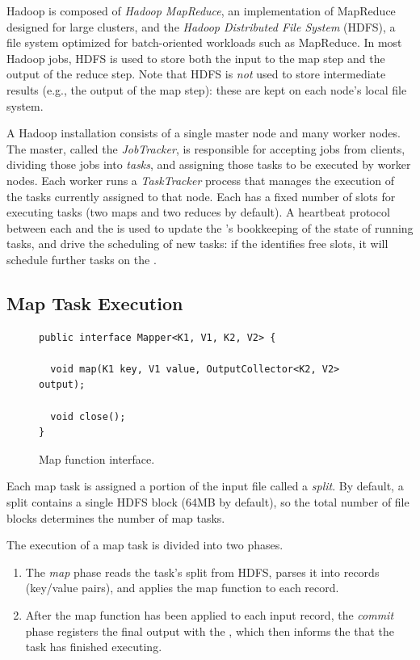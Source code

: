 Hadoop is composed of \emph{Hadoop MapReduce}, an implementation of MapReduce
designed for large clusters, and the \emph{Hadoop Distributed File System}
(HDFS), a file system optimized for batch-oriented workloads such as MapReduce.
In most Hadoop jobs, HDFS is used to store both the input to the map step and
the output of the reduce step.  Note that HDFS is \emph{not} used to store
intermediate results (e.g., the output of the map step): these are kept on each
node's local file system.

A Hadoop installation consists of a single master node and many worker nodes.
The master, called the \emph{JobTracker}, is responsible for accepting jobs
from clients, dividing those jobs into \emph{tasks}, and assigning those tasks
to be executed by worker nodes.  Each worker runs a \emph{TaskTracker} process
that manages the execution of the tasks currently assigned to that node.  Each
{\TT} has a fixed number of slots for executing tasks (two maps and two reduces
by default).  A heartbeat protocol between each {\TT} and the {\JT} is used to
update the {\JT}'s bookkeeping of the state of running tasks, and drive the
scheduling of new tasks: if the \JT identifies free {\TT} slots, it will
schedule further tasks on the {\TT}.

\subsection{Map Task Execution}
\label{ch:mrback:sec:maptask}

\begin{figure}[t]
\ssp
\begin{minipage}{\linewidth}
\centering
\begin{verbatim}
public interface Mapper<K1, V1, K2, V2> {
  
  void map(K1 key, V1 value, OutputCollector<K2, V2> output);

  void close();
}
\end{verbatim}
\end{minipage}
\caption{Map function interface.}
\label{fig:mapfunction}
\end{figure}

Each map task is assigned a portion of the input file called a \emph{split}.
By default, a split contains a single HDFS block (64MB by default), so the
total number of file blocks determines the number of map tasks.

The execution of a map task is divided into two phases.
\begin{enumerate}
\item
  The \emph{map} phase reads the task's split from HDFS, parses it into
  records (key/value pairs), and applies the map function to each
  record.
\item
  After the map function has been applied to each input record, the
  \emph{commit} phase registers the final output with the {\TT}, which
  then informs the {\JT} that the task has finished executing.
\end{enumerate}

